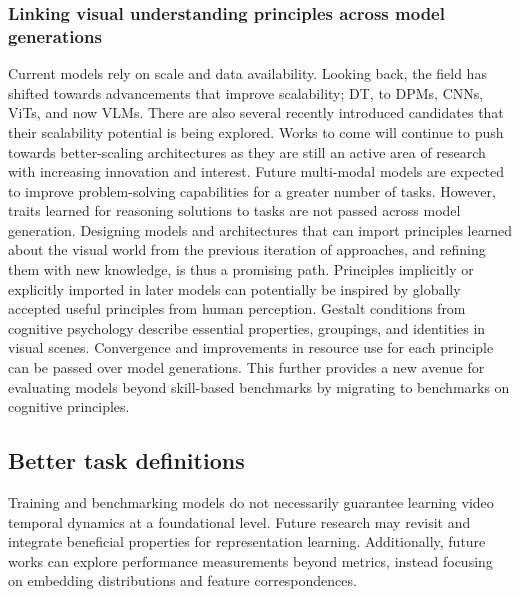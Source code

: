
\subsubsection{Linking visual understanding principles across model generations}

Current models rely on scale and data availability. Looking back, the field has shifted towards advancements that improve scalability; DT, to DPMs, CNNs, ViTs, and now VLMs. There are also several recently introduced candidates \citep{dao2022flashattention,gu2023mamba,poli2023hyena} that their scalability potential is being explored. Works to come will continue to push towards better-scaling architectures as they are still an active area of research with increasing innovation and interest. Future multi-modal models are expected to improve problem-solving capabilities for a greater number of tasks. However, traits learned for reasoning solutions to tasks are not passed across model generation. Designing models and architectures that can import principles learned about the visual world from the previous iteration of approaches, and refining them with new knowledge, is thus a promising path. Principles implicitly or explicitly imported in later models can potentially be inspired by globally accepted useful principles from human perception. Gestalt conditions from cognitive psychology \citep{koffka2013principles,kohler1967gestalt} describe essential properties, groupings, and identities in visual scenes. Convergence and improvements in resource use for each principle can be passed over model generations. This further provides a new avenue for evaluating models beyond skill-based benchmarks by migrating to benchmarks on cognitive principles.



\subsection{Better task definitions}
\label{sec:outlook::tasks}

Training and benchmarking models do not necessarily guarantee learning video temporal dynamics at a foundational level. Future research may revisit and integrate beneficial properties for representation learning. Additionally, future works can explore performance measurements beyond metrics, instead focusing on embedding distributions and feature correspondences. 


